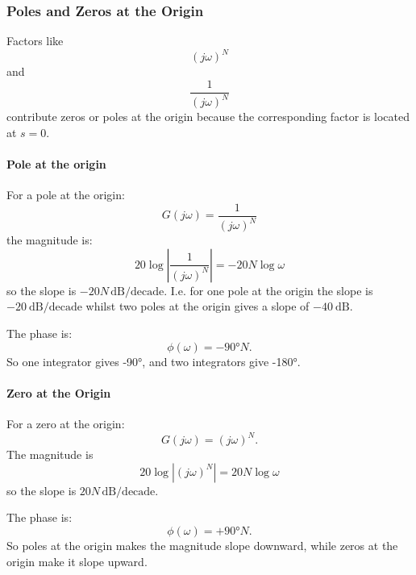 \subsubsection{Poles and Zeros at the Origin}
Factors like
\begin{equation*}
  \left( j\omega \right)^{N}
\end{equation*}
and
\begin{equation*}
  \frac{1}{\left( j\omega \right)^{N}}
\end{equation*}
contribute zeros or poles at the origin because the corresponding factor is located at $s = 0$.

\paragraph{Pole at the origin}
For a pole at the origin:
\begin{equation*}
  G(j\omega) = \frac{1}{\left( j\omega \right)^{N}}
\end{equation*}
the magnitude is:
\begin{equation*}
  20 \log \left| \frac{1}{\left( j\omega \right)^{N}} \right| = - 20 N \log \omega
\end{equation*}
so the slope is $-20N \, \unit{\dB} / \text{decade}$.
I.e. for one pole at the origin the slope is $-\qty{20}{\dB} / \text{decade}$ whilst two poles at the origin gives a slope of $- \qty{40}{\dB}$.

The phase is:
\begin{equation*}
  \phi(\omega) = - \ang{90} N
.\end{equation*}
So one integrator gives \ang{-90}, and two integrators give \ang{-180}.

\paragraph{Zero at the Origin}
For a zero at the origin:
\begin{equation*}
  G(j\omega) = \left( j\omega \right)^{N}
.\end{equation*}
The magnitude is
\begin{equation*}
  20 \log \left| \left( j\omega \right)^{N} \right| = 20 N \log \omega
\end{equation*}
so the slope is $20 N \, \unit{\dB} / \text{decade}$.

The phase is:
\begin{equation*}
  \phi(\omega) = + \ang{90} N
.\end{equation*}
So poles at the origin makes the magnitude slope downward, while zeros at the origin make it slope upward.

